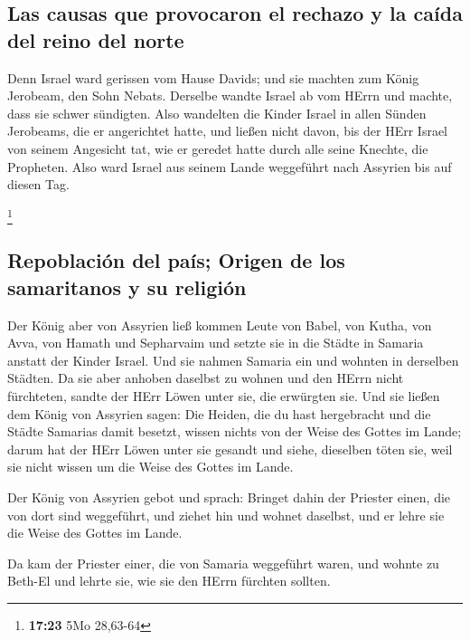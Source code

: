 \hypertarget{las-causas-que-provocaron-el-rechazo-y-la-cauxedda-del-reino-del-norte}{%
\subsection{Las causas que provocaron el rechazo y la caída del reino
del
norte}\label{las-causas-que-provocaron-el-rechazo-y-la-cauxedda-del-reino-del-norte}}

 Denn Israel ward gerissen vom Hause Davids; und sie
machten zum König Jerobeam, den Sohn Nebats. Derselbe wandte Israel ab
vom HErrn und machte, dass sie schwer sündigten.  Also
wandelten die Kinder Israel in allen Sünden Jerobeams, die er
angerichtet hatte, und ließen nicht davon,  bis der HErr
Israel von seinem Angesicht tat, wie er geredet hatte durch alle seine
Knechte, die Propheten. Also ward Israel aus seinem Lande weggeführt
nach Assyrien bis auf diesen Tag.

\footnote{\textbf{17:23} 5Mo 28,63-64}

\hypertarget{repoblaciuxf3n-del-pauxeds-origen-de-los-samaritanos-y-su-religiuxf3n}{%
\subsection{Repoblación del país; Origen de los samaritanos y su
religión}\label{repoblaciuxf3n-del-pauxeds-origen-de-los-samaritanos-y-su-religiuxf3n}}

 Der König aber von Assyrien ließ kommen Leute von Babel,
von Kutha, von Avva, von Hamath und Sepharvaim und setzte sie in die
Städte in Samaria anstatt der Kinder Israel. Und sie nahmen Samaria ein
und wohnten in derselben Städten.  Da sie aber anhoben
daselbst zu wohnen und den HErrn nicht fürchteten, sandte der HErr Löwen
unter sie, die erwürgten sie.  Und sie ließen dem König
von Assyrien sagen: Die Heiden, die du hast hergebracht und die Städte
Samarias damit besetzt, wissen nichts von der Weise des Gottes im Lande;
darum hat der HErr Löwen unter sie gesandt und siehe, dieselben töten
sie, weil sie nicht wissen um die Weise des Gottes im Lande.

 Der König von Assyrien gebot und sprach: Bringet dahin
der Priester einen, die von dort sind weggeführt, und ziehet hin und
wohnet daselbst, und er lehre sie die Weise des Gottes im Lande.

 Da kam der Priester einer, die von Samaria weggeführt
waren, und wohnte zu Beth-El und lehrte sie, wie sie den HErrn fürchten
sollten.

